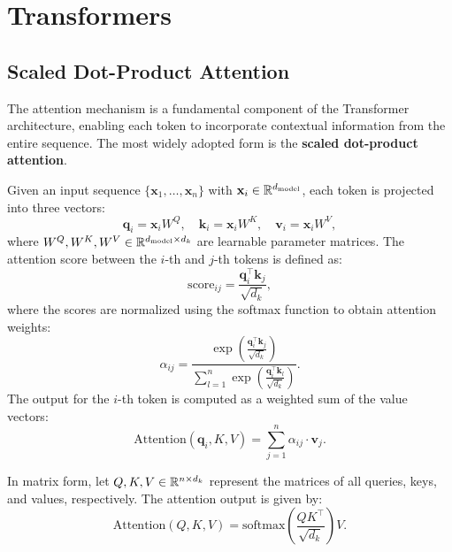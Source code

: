 \chapter{Transformers}\label{chap:transformers}

\section{Scaled Dot-Product Attention}

The attention mechanism is a fundamental component of the Transformer architecture, enabling each token to incorporate contextual information from the entire sequence. The most widely adopted form is the \textbf{scaled dot-product attention}.

Given an input sequence \(\{\mathbf{x}_1, \dots, \mathbf{x}_n\}\) with \(\mathbf{x}_i \in \mathbb{R}^{d_{\text{model}}}\), each token is projected into three vectors:
\begin{equation*}
	\mathbf{q}_i = \mathbf{x}_i W^Q, \quad \mathbf{k}_i = \mathbf{x}_i W^K, \quad \mathbf{v}_i = \mathbf{x}_i W^V,
\end{equation*}
where \(W^Q, W^K, W^V \in \mathbb{R}^{d_{\text{model}} \times d_k}\) are learnable parameter matrices.
The attention score between the \(i\)-th and \(j\)-th tokens is defined as:
\begin{equation*}
	\text{score}_{ij} = \frac{\mathbf{q}_i^\top \mathbf{k}_j}{\sqrt{d_k}},
\end{equation*}
where the scores are normalized using the softmax function to obtain attention weights:
\begin{equation*}
	\alpha_{ij} = \frac{\exp\left( \frac{\mathbf{q}_i^\top \mathbf{k}_j}{\sqrt{d_k}} \right)}{\sum_{l=1}^{n} \exp\left( \frac{\mathbf{q}_i^\top \mathbf{k}_l}{\sqrt{d_k}} \right)}.
\end{equation*}
The output for the \(i\)-th token is computed as a weighted sum of the value vectors:
\begin{equation*}
	\text{Attention}(\mathbf{q}_i, K, V) = \sum_{j=1}^{n} \alpha_{ij} \cdot \mathbf{v}_j.
\end{equation*}

In matrix form, let \(Q, K, V \in \mathbb{R}^{n \times d_k}\) represent the matrices of all queries, keys, and values, respectively. The attention output is given by:
\begin{equation*}
	\text{Attention}(Q, K, V) = \text{softmax}\left( \frac{QK^\top}{\sqrt{d_k}} \right)V.
\end{equation*}

